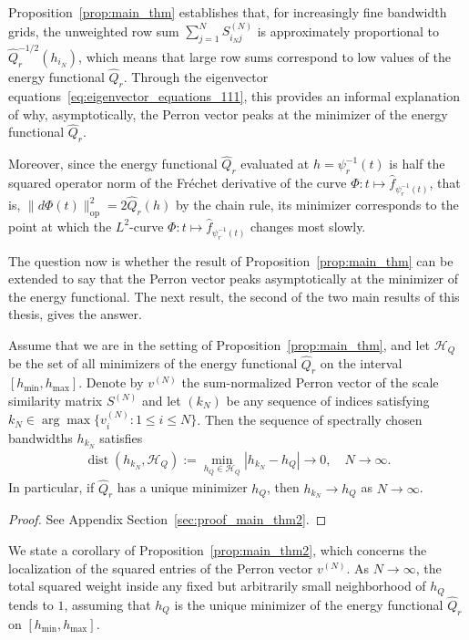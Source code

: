 Proposition~\ref{prop:main_thm} establishes that, for increasingly fine bandwidth grids, the unweighted row sum $\sum_{j=1}^{N}S_{i_Nj}^{(N)}$ is approximately proportional to $\hat{Q}_r^{-1/2}(h_{i_N})$, which means that large row sums correspond to low values of the energy functional $\hat{Q}_r$. Through the eigenvector equations~\eqref{eq:eigenvector_equations_111}, this provides an informal explanation of why, asymptotically, the Perron vector peaks at the minimizer of the energy functional $\hat{Q}_r$.

Moreover, since the energy functional $\hat{Q}_r$ evaluated at $h=\psi_r^{-1}(t)$ is half the squared operator norm of the Fréchet derivative of the curve $\Phi:t\mapsto\hat{f}_{\psi_r^{-1}(t)}$, that is, $\|d\Phi(t)\|_{\operatorname{op}}^2=2\hat{Q}_r(h)$ by the chain rule, its minimizer corresponds to the point at which the $L^2$-curve $\Phi:t\mapsto\hat{f}_{\psi_r^{-1}(t)}$ changes most slowly.

The question now is whether the result of Proposition~\ref{prop:main_thm} can be extended to say that the Perron vector peaks asymptotically at the minimizer of the energy functional. The next result, the second of the two main results of this thesis, gives the answer.

\begin{Prop}\label{prop:main_thm2}
    Assume that we are in the setting of Proposition~\ref{prop:main_thm}, and let $\mathcal{H}_Q$ be the set of all minimizers of the energy functional $\hat{Q}_r$ on the interval $[h_{\min},h_{\max}]$. Denote by $v^{(N)}$ the sum-normalized Perron vector of the scale similarity matrix $S^{(N)}$ and let $(k_N)$ be any sequence of indices satisfying $k_N\in\arg\max\{v_i^{(N)}:1\le i\le N\}$. Then the sequence of spectrally chosen bandwidths $h_{k_N}$ satisfies
    \begin{align}\label{eq:main_result}
        \operatorname{dist}(h_{k_N},\mathcal{H}_Q):=\min_{h_Q\in\mathcal{H}_Q}|h_{k_{N}}-h_Q|\to 0,\quad N\to\infty.
    \end{align}
    In particular, if $\hat{Q}_r$ has a unique minimizer $h_Q$, then $h_{k_N}\to h_Q$ as $N\to\infty$.
\end{Prop}

\begin{proof}
    See Appendix Section~\ref{sec:proof_main_thm2}.
\end{proof}

We state a corollary of Proposition~\ref{prop:main_thm2}, which concerns the localization of the squared entries of the Perron vector $v^{(N)}$. As $N\to\infty$, the total squared weight inside any fixed but arbitrarily small neighborhood of $h_Q$ tends to $1$, assuming that $h_Q$ is the unique minimizer of the energy functional $\hat{Q}_r$ on $[h_{\min},h_{\max}]$.

